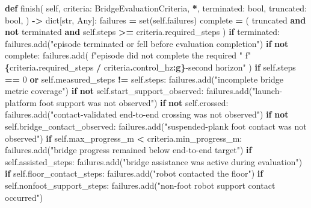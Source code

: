 \documentclass[
  american,
  11pt,
  letterpaper,
]{article}
\newenvironment{Shaded}{\begin{snugshade}}{\end{snugshade}}
\newcommand{\BuiltInTok}[1]{#1}
\newcommand{\ControlFlowTok}[1]{\textcolor[rgb]{0.13,0.29,0.53}{\textbf{#1}}}
\newcommand{\DecValTok}[1]{\textcolor[rgb]{0.00,0.00,0.81}{#1}}
\newcommand{\KeywordTok}[1]{\textcolor[rgb]{0.13,0.29,0.53}{\textbf{#1}}}
\newcommand{\NormalTok}[1]{#1}
\newcommand{\OperatorTok}[1]{\textcolor[rgb]{0.81,0.36,0.00}{\textbf{#1}}}
\newcommand{\SpecialCharTok}[1]{\textcolor[rgb]{0.81,0.36,0.00}{\textbf{#1}}}
\newcommand{\SpecialStringTok}[1]{\textcolor[rgb]{0.31,0.60,0.02}{#1}}
\newcommand{\StringTok}[1]{\textcolor[rgb]{0.31,0.60,0.02}{#1}}
\newcommand{\VariableTok}[1]{\textcolor[rgb]{0.00,0.00,0.00}{#1}}
\renewenvironment{Shaded}{\par\smallskip}{\par\smallskip}
\begin{document}
\begin{Shaded}
\begin{Highlighting}[]
    \KeywordTok{def}\NormalTok{ finish(}
        \VariableTok{self}\NormalTok{,}
\NormalTok{        criteria: BridgeEvaluationCriteria,}
        \OperatorTok{*}\NormalTok{,}
\NormalTok{        terminated: }\BuiltInTok{bool}\NormalTok{,}
\NormalTok{        truncated: }\BuiltInTok{bool}\NormalTok{,}
\NormalTok{    ) }\OperatorTok{{-}\textgreater{}} \BuiltInTok{dict}\NormalTok{[}\BuiltInTok{str}\NormalTok{, Any]:}
\NormalTok{        failures }\OperatorTok{=} \BuiltInTok{set}\NormalTok{(}\VariableTok{self}\NormalTok{.failures)}
\NormalTok{        complete }\OperatorTok{=}\NormalTok{ (}
\NormalTok{            truncated}
            \KeywordTok{and} \KeywordTok{not}\NormalTok{ terminated}
            \KeywordTok{and} \VariableTok{self}\NormalTok{.steps }\OperatorTok{\textgreater{}=}\NormalTok{ criteria.required\_steps}
\NormalTok{        )}
        \ControlFlowTok{if}\NormalTok{ terminated:}
\NormalTok{            failures.add(}\StringTok{"episode terminated or fell before evaluation completion"}\NormalTok{)}
        \ControlFlowTok{if} \KeywordTok{not}\NormalTok{ complete:}
\NormalTok{            failures.add(}
                \SpecialStringTok{f"episode did not complete the required "}
                \SpecialStringTok{f"}\SpecialCharTok{\{}\NormalTok{criteria}\SpecialCharTok{.}\NormalTok{required\_steps }\OperatorTok{/}\NormalTok{ criteria}\SpecialCharTok{.}\NormalTok{control\_hz}\SpecialCharTok{:g\}}\SpecialStringTok{{-}second horizon"}
\NormalTok{            )}
        \ControlFlowTok{if} \VariableTok{self}\NormalTok{.steps }\OperatorTok{==} \DecValTok{0} \KeywordTok{or} \VariableTok{self}\NormalTok{.measured\_steps }\OperatorTok{!=} \VariableTok{self}\NormalTok{.steps:}
\NormalTok{            failures.add(}\StringTok{"incomplete bridge metric coverage"}\NormalTok{)}
        \ControlFlowTok{if} \KeywordTok{not} \VariableTok{self}\NormalTok{.start\_support\_observed:}
\NormalTok{            failures.add(}\StringTok{"launch{-}platform foot support was not observed"}\NormalTok{)}
        \ControlFlowTok{if} \KeywordTok{not} \VariableTok{self}\NormalTok{.crossed:}
\NormalTok{            failures.add(}\StringTok{"contact{-}validated end{-}to{-}end crossing was not observed"}\NormalTok{)}
        \ControlFlowTok{if} \KeywordTok{not} \VariableTok{self}\NormalTok{.bridge\_contact\_observed:}
\NormalTok{            failures.add(}\StringTok{"suspended{-}plank foot contact was not observed"}\NormalTok{)}
        \ControlFlowTok{if} \VariableTok{self}\NormalTok{.max\_progress\_m }\OperatorTok{\textless{}}\NormalTok{ criteria.min\_progress\_m:}
\NormalTok{            failures.add(}\StringTok{"bridge progress remained below end{-}to{-}end target"}\NormalTok{)}
        \ControlFlowTok{if} \VariableTok{self}\NormalTok{.assisted\_steps:}
\NormalTok{            failures.add(}\StringTok{"bridge assistance was active during evaluation"}\NormalTok{)}
        \ControlFlowTok{if} \VariableTok{self}\NormalTok{.floor\_contact\_steps:}
\NormalTok{            failures.add(}\StringTok{"robot contacted the floor"}\NormalTok{)}
        \ControlFlowTok{if} \VariableTok{self}\NormalTok{.nonfoot\_support\_steps:}
\NormalTok{            failures.add(}\StringTok{"non{-}foot robot support contact occurred"}\NormalTok{)}


\end{Highlighting}
\end{Shaded}
\end{document}
